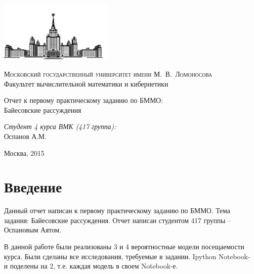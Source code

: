 \documentclass[12pt, a4paper]{article}
\begin{document}
	\thispagestyle{empty}

	\begin{singlespace}
	\begin{titlepage}
		\begin{center}
			\includegraphics[height = 3cm]{msu.png}

			{\scshape Московский государственный университет имени М.~В.~Ломоносова}\\
			Факультет вычислительной математики и кибернетики\\
			\centerline{\hfill\hrulefill\hrulefill\hrulefill\hrulefill\hfill}

			\vfill

			{\LARGE Отчет к первому практическому заданию по БММО: \\ Байесовские рассуждения}

			\vspace{1cm}

		\end{center}

		\vfill
		\begin{flushright}
			\textit{Студент 4 курса ВМК (417 группа):}\\
				Оспанов А.М.

			\vspace{5mm}

		\end{flushright}

		\vfill

		\begin{center}
		Москва, 2015
		\end{center}
	\end{titlepage}
	\end{singlespace}

	\tableofcontents


	\newpage
	\section{Введение}
		Данный отчет написан к первому практическому заданию по БММО. Тема задания: Байесовские рассуждения. Отчет написан студентом 417 группы -- Оспановым Аятом.

		В данной работе были реализованы 3 и 4 вероятностные модели посещаемости курса. Были сделаны все исследования, требуемые в задании. Ipython Notebook-и поделены на 2, т.е. каждая модель в своем Notebook-е.
\end{document}
